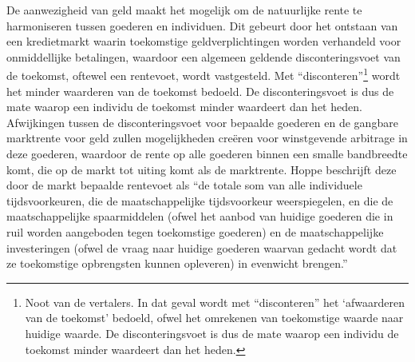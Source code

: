 De aanwezigheid van geld maakt het mogelijk om de natuurlijke rente te harmoniseren tussen goederen en individuen. Dit gebeurt door het ontstaan van een kredietmarkt waarin toekomstige geldverplichtingen worden verhandeld voor onmiddellijke betalingen, waardoor een algemeen geldende disconteringsvoet van de toekomst, oftewel een rentevoet, wordt vastgesteld. Met ``disconteren''\footnote{Noot van de vertalers. In dat geval wordt met “disconteren” het `afwaarderen van de toekomst' bedoeld, ofwel het omrekenen van toekomstige waarde naar huidige waarde. De disconteringsvoet is dus de mate waarop een individu de toekomst minder waardeert dan het heden.} wordt het minder waarderen van de toekomst bedoeld. De disconteringsvoet is dus de mate waarop een individu de toekomst minder waardeert dan het heden. Afwijkingen tussen de disconteringsvoet voor bepaalde goederen en de gangbare marktrente voor geld zullen mogelijkheden creëren voor winstgevende arbitrage in deze goederen, waardoor de rente op alle goederen binnen een smalle bandbreedte komt, die op de markt tot uiting komt als de marktrente. Hoppe beschrijft deze door de markt bepaalde rentevoet als ``de totale som van alle individuele tijdsvoorkeuren, die de maatschappelijke tijdsvoorkeur weerspiegelen, en die de maatschappelijke spaarmiddelen (ofwel het aanbod van huidige goederen die in ruil worden aangeboden tegen toekomstige goederen) en de maatschappelijke investeringen (ofwel de vraag naar huidige goederen waarvan gedacht wordt dat ze toekomstige opbrengsten kunnen opleveren) in evenwicht brengen.''\autocite{159}

